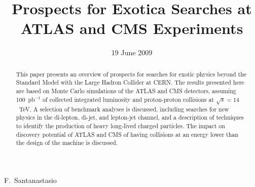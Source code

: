 \documentclass{cmspaper}
\begin{document}

\begin{titlepage}

   \date{19 June 2009}

  \title{Prospects for Exotica Searches at ATLAS and CMS Experiments}
  \begin{Authlist}
    F.~Santanastasio
  \end{Authlist}



  \begin{abstract}
    This paper presents an overview of prospects for searches for exotic physics 
    beyond the Standard Model with the Large Hadron Collider at CERN. 
    The results presented here are based on Monte Carlo simulations of the
    ATLAS and CMS detectors, assuming 100~pb$^{-1}$ of collected integrated 
    luminosity and proton-proton collisions 
    at $\sqrt{s} = 14$~TeV. A selection of benchmark analyses is discussed, 
    including searches for new physics in the di-lepton, di-jet, and lepton-jet channel, 
    and a description of techniques to identify the production of 
    heavy long-lived charged particles. 
    The impact on discovery potential of ATLAS and CMS  
    of having collisions at an energy lower than the design of the machine 
    is discussed.
  \end{abstract} 

  
\end{titlepage}

\setcounter{page}{1}%
\end{document}
